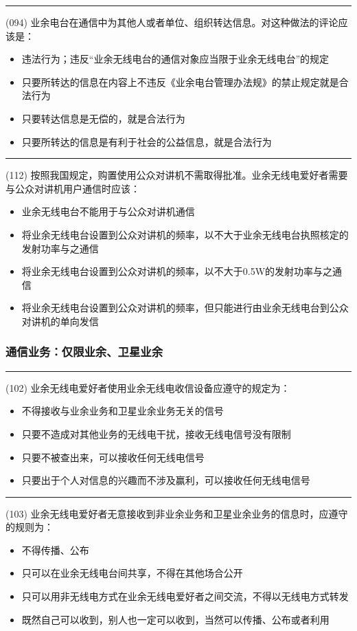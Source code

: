 \documentclass[twocolumn,hyperref,UTF8]{ctexart}  %
\begin{document}
\noindent\rule{0.5\textwidth}{1pt}
\heiti (094) 业余电台在通信中为其他人或者单位、组织转达信息。对这种做法的评论应该是： \songti {\color{gray} [LK0058] }
\begin{itemize}
	\item  违法行为；违反“业余无线电台的通信对象应当限于业余无线电台”的规定
	\item  只要所转达的信息在内容上不违反《业余电台管理办法规》的禁止规定就是合法行为
	\item  只要转达信息是无偿的，就是合法行为
	\item  只要所转达的信息是有利于社会的公益信息，就是合法行为
\end{itemize}


\noindent\rule{0.5\textwidth}{1pt}
\heiti (112) 按照我国规定，购置使用公众对讲机不需取得批准。业余无线电爱好者需要与公众对讲机用户通信时应该： \songti {\color{gray} [LK1010] }
\begin{itemize}
	\item  业余无线电台不能用于与公众对讲机通信
	\item  将业余无线电台设置到公众对讲机的频率，以不大于业余无线电台执照核定的发射功率与之通信
	\item  将业余无线电台设置到公众对讲机的频率，以不大于0.5W的发射功率与之通信
	\item  将业余无线电台设置到公众对讲机的频率，但只能进行由业余无线电台到公众对讲机的单向发信
\end{itemize}


\vspace{12pt}
\subsubsection{通信业务：仅限业余、卫星业余}


\noindent\rule{0.5\textwidth}{1pt}
\heiti (102) 业余无线电爱好者使用业余无线电收信设备应遵守的规定为： \songti {\color{gray} [LK0066] }
\begin{itemize}
	\item  不得接收与业余业务和卫星业余业务无关的信号
	\item  只要不造成对其他业务的无线电干扰，接收无线电信号没有限制
	\item  只要不被查出来，可以接收任何无线电信号
	\item  只要出于个人对信息的兴趣而不涉及赢利，可以接收任何无线电信号
\end{itemize}


\noindent\rule{0.5\textwidth}{1pt}
\heiti (103) 业余无线电爱好者无意接收到非业余业务和卫星业余业务的信息时，应遵守的规则为： \songti {\color{gray} [LK0067] }
\begin{itemize}
	\item  不得传播、公布
	\item  只可以在业余无线电台间共享，不得在其他场合公开
	\item  只可以用非无线电方式在业余无线电爱好者之间交流，不得以无线电方式转发
	\item  既然自己可以收到，别人也一定可以收到，当然可以传播、公布或者利用
\end{itemize}
\end{document}
